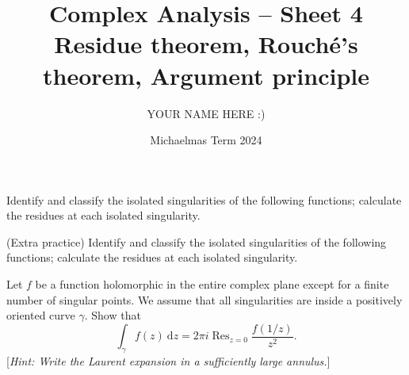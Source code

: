 \documentclass[answers]{exam}
\title{Complex Analysis -- Sheet 4\\Residue theorem, Rouch\'e's theorem, Argument principle}
\author{YOUR NAME HERE :)}
\date{Michaelmas Term 2024}
\begin{document}
\maketitle
\begin{questions}

\question%
Identify and classify the isolated singularities of the following functions; calculate the residues at each isolated singularity.



\question%
(Extra practice) Identify and classify the isolated singularities of the following functions; calculate the residues at each isolated singularity.



\question%
Let $f$ be a function holomorphic in the entire complex plane except for a finite number of singular points. We assume that all singularities are inside a positively oriented curve $\gamma$. Show that \[
	\int_\gamma f(z)~\mathrm dz=2\pi i\operatorname{Res}_{z=0}\frac{f(1/z)}{z^2}.
\] [\emph{Hint: Write the Laurent expansion in a sufficiently large annulus.}]




\end{questions}
\end{document}
